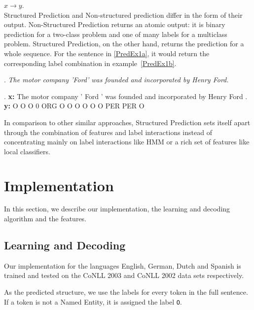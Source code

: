 \documentclass[11pt]{article}
\newcommand{\namedentity}{Named Entity}
\newcommand{\Oo}{\texttt O}
\begin{document}
$ x \rightarrow y $. \\

Structured Prediction and Non-structured prediction differ in the form of their output.
Non-Structured Prediction returns an atomic output: it is binary prediction for a two-class problem and one of many labels for a multiclass problem. 
Structured Prediction, on the other hand, returns the prediction for a whole sequence. 
For the sentence in \ref{PredEx1a}, it would return the corresponding label combination in example~\ref{PredEx1b}. 

\begin{figure*}[ht]

\ex. \emph{The motor company 'Ford' was founded and incorporated  by Henry Ford.} \label{PredEx1a}
 
\exg. \textbf{x:} The motor company ' Ford ' was founded and incorporated by Henry Ford .\\
      \textbf{y:}  O   O      O     0 ORG  O  O     O     O       O        O PER   PER  O  \label{PredEx1b} \\
\caption{Input and predicted structure for the \namedentity task.}

\end{figure*}

In comparison to other similar approaches, Structured Prediction sets itself apart through the combination of features and label interactions instead
of concentrating mainly on label interactions like HMM or a rich set of features like local classifiers. 

\section{Implementation}
In this section, we describe our implementation, the learning and decoding algorithm and the features.


\subsection{Learning and Decoding}

Our implementation for the languages English, German, Dutch and Spanish is trained and tested on the CoNLL 2003 and CoNLL 2002 data sets respectively. 

As the predicted structure, we use the labels for every token in the full sentence. If a token is not a \namedentity, it is assigned the label \Oo.
\end{document}
